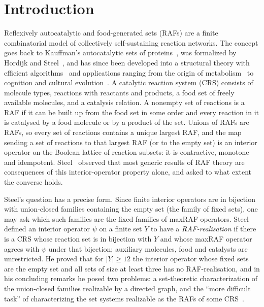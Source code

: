 \documentclass[11pt,a4paper]{article}
\theoremstyle{plain}
\theoremstyle{definition}
\theoremstyle{remark}
\begin{document}
\section{Introduction}

Reflexively autocatalytic and food-generated sets (RAFs) are a finite combinatorial model of collectively self-sustaining reaction networks. The concept goes back to Kauffman's autocatalytic sets of proteins~\cite{kauffman1986autocatalytic,kauffman1993origins}, was formalized by Hordijk and Steel~\cite{hordijk2004detecting}, and has since been developed into a structural theory with efficient algorithms~\cite{hordijk2015algorithms,steel2019autocatalytic,steel2020structure} and applications ranging from the origin of metabolism~\cite{xavier2020autocatalytic,hordijk2018life} to cognition and cultural evolution~\cite{gabora2017autocatalytic}. A catalytic reaction system (CRS) consists of molecule types, reactions with reactants and products, a food set of freely available molecules, and a catalysis relation. A nonempty set of reactions is a RAF if it can be built up from the food set in some order and every reaction in it is catalysed by a food molecule or by a product of the set. Unions of RAFs are RAFs, so every set of reactions contains a unique largest RAF, and the map sending a set of reactions to that largest RAF (or to the empty set) is an interior operator on the Boolean lattice of reaction subsets: it is contractive, monotone and idempotent. Steel~\cite{steel2023interior} observed that most generic results of RAF theory are consequences of this interior-operator property alone, and asked to what extent the converse holds.

Steel's question has a precise form. Since finite interior operators are in bijection with union-closed families containing the empty set (the family of fixed sets), one may ask which such families are the fixed families of maxRAF operators. Steel defined an interior operator $\psi$ on a finite set $Y$ to have a \emph{RAF-realisation} if there is a CRS whose reaction set is in bijection with $Y$ and whose maxRAF operator agrees with $\psi$ under that bijection; auxiliary molecules, food and catalysts are unrestricted. He proved that for $|Y|\ge 12$ the interior operator whose fixed sets are the empty set and all sets of size at least three has no RAF-realisation, and in his concluding remarks he posed two problems: a set-theoretic characterization of the union-closed families realizable by a directed graph, and the ``more difficult task'' of characterizing the set systems realizable as the RAFs of some CRS~\cite[Section~4]{steel2023interior}.
\end{document}
